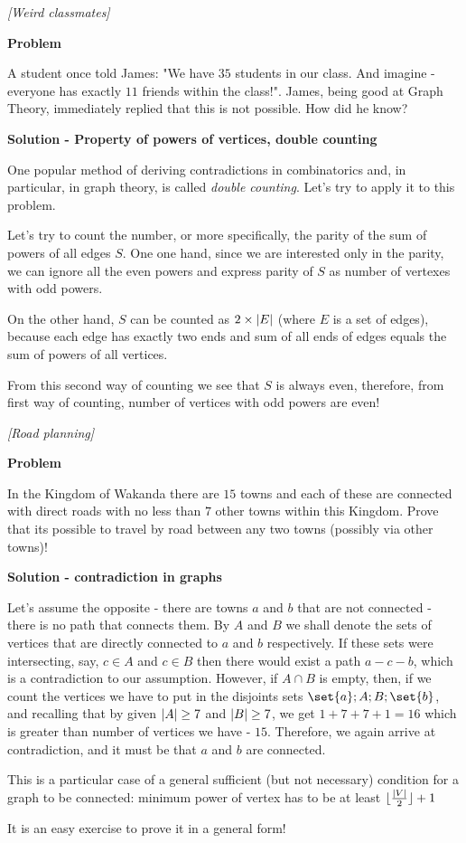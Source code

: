 %
\filbreak
\begin{problem}
\textit{[Weird classmates]}

\textbf{Problem}

A student once told James: "We have $35$ students in our class. And imagine - everyone has exactly $11$ friends within the class!". James, being good at Graph Theory, immediately replied that this is not possible. How did he know?

\textbf{Solution - Property of powers of vertices, double counting}

One popular method of deriving contradictions in combinatorics and, in particular, in graph theory, is called \textit{double counting}. Let's try to apply it to this problem.

Let's try to count the number, or more specifically, the parity of the sum of powers of all edges $S$. One one hand, since we are interested only in the parity, we can ignore all the even powers and express parity of $S$ as number of vertexes with odd powers. 

On the other hand, $S$ can be counted as $2 \times \lvert E\rvert$ (where $E$ is a set of edges), because each edge has exactly two ends and sum of all ends of edges equals the sum of powers of all vertices. 

From this second way of counting we see that $S$ is always even, therefore, from first way of counting, number of vertices with odd powers are even!
\end{problem}
%
\filbreak
\begin{problem}
\textit{[Road planning]}

\textbf{Problem}

In the Kingdom of Wakanda there are $15$ towns and each of these are connected with direct roads with no less than $7$ other towns within this Kingdom. Prove that its possible to travel by road between any two towns (possibly via other towns)!

\textbf{Solution - contradiction in graphs}

Let's assume the opposite - there are towns $a$ and $b$ that are not connected - there is no path that connects them.  By $A$ and $B$ we shall denote the sets of vertices that are directly connected to $a$ and $b$ respectively. If these sets were intersecting, say, $c \in A$ and $c \in B$ then there would exist a path $a-c-b$, which is a contradiction to our assumption. 
However, if $A \cap B$ is empty, then, if we count the vertices we have to put in the disjoints sets $\set{a}; A; B; \set{b}$, and recalling that by given $\lvert A\rvert \ge 7$ and $\lvert B\rvert \ge 7$, we get $1 + 7 + 7 + 1 = 16$ which is greater than number of vertices we have - $15$. Therefore, we again arrive at contradiction,  and it must be that $a$ and $b$ are connected.

This is a particular case of a general sufficient (but not necessary) condition for a graph to be connected: minimum power of vertex has to be at least $\lfloor\frac{\lvert V\rvert}{2}\rfloor+1$

It is an easy exercise to prove it in a general form!
\end{problem}
